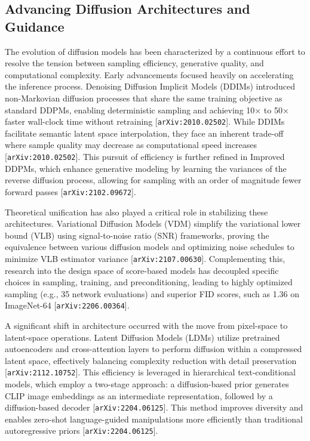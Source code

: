 \documentclass[11pt]{article}
\begin{document}
\subsection{Advancing Diffusion Architectures and Guidance}

The evolution of diffusion models has been characterized by a continuous effort to resolve the tension between sampling efficiency, generative quality, and computational complexity. Early advancements focused heavily on accelerating the inference process. Denoising Diffusion Implicit Models (DDIMs) introduced non-Markovian diffusion processes that share the same training objective as standard DDPMs, enabling deterministic sampling and achieving 10× to 50× faster wall-clock time without retraining [\texttt{arXiv:2010.02502}]. While DDIMs facilitate semantic latent space interpolation, they face an inherent trade-off where sample quality may decrease as computational speed increases [\texttt{arXiv:2010.02502}]. This pursuit of efficiency is further refined in Improved DDPMs, which enhance generative modeling by learning the variances of the reverse diffusion process, allowing for sampling with an order of magnitude fewer forward passes [\texttt{arXiv:2102.09672}].

Theoretical unification has also played a critical role in stabilizing these architectures. Variational Diffusion Models (VDM) simplify the variational lower bound (VLB) using signal-to-noise ratio (SNR) frameworks, proving the equivalence between various diffusion models and optimizing noise schedules to minimize VLB estimator variance [\texttt{arXiv:2107.00630}]. Complementing this, research into the design space of score-based models has decoupled specific choices in sampling, training, and preconditioning, leading to highly optimized sampling (e.g., 35 network evaluations) and superior FID scores, such as 1.36 on ImageNet-64 [\texttt{arXiv:2206.00364}].

A significant shift in architecture occurred with the move from pixel-space to latent-space operations. Latent Diffusion Models (LDMs) utilize pretrained autoencoders and cross-attention layers to perform diffusion within a compressed latent space, effectively balancing complexity reduction with detail preservation [\texttt{arXiv:2112.10752}]. This efficiency is leveraged in hierarchical text-conditional models, which employ a two-stage approach: a diffusion-based prior generates CLIP image embeddings as an intermediate representation, followed by a diffusion-based decoder [\texttt{arXiv:2204.06125}]. This method improves diversity and enables zero-shot language-guided manipulations more efficiently than traditional autoregressive priors [\texttt{arXiv:2204.06125}].
\end{document}
